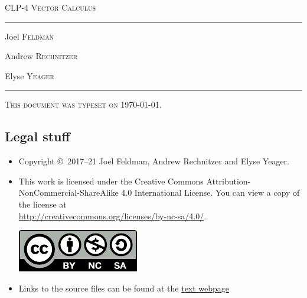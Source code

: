 \documentclass[12pt,letterpaper, openany]{book}
\begin{document}
\setcounter{page}{0}

\begin{titlepage} 
\begin{center} 
\textsc{\LARGE
CLP-4 Vector Calculus
}\\[2ex]

\vspace{5ex}
\hrule
\vspace{5ex}

\begin{minipage}[t]{0.3\textwidth} \begin{flushleft}
\large Joel \textsc{Feldman}
\end{flushleft} \end{minipage}%
\begin{minipage}[t]{0.3\textwidth} \begin{flushleft}
\large Andrew \textsc{Rechnitzer}
\end{flushleft} \end{minipage}%
\begin{minipage}[t]{0.3\textwidth} \begin{flushright}
\large Elyse \textsc{Yeager}
\end{flushright} \end{minipage}%
\end{center}
\vspace{2ex}
\hrule

\vfill
\textsc{This document was typeset on \today.}
\end{titlepage}

\subsection*{Legal stuff}
\begin{itemize}
 \item Copyright \copyright\ 2017--21 Joel Feldman, Andrew Rechnitzer and Elyse Yeager.

\item This work is licensed under the
Creative Commons Attribution-NonCommercial-ShareAlike 4.0 International
License. You can view a copy of the license at \\
\url{http://creativecommons.org/licenses/by-nc-sa/4.0/}.
\begin{center}
 \includegraphics{by-nc-sa.pdf}
\end{center}


\item Links to the source files can be found at the \href{http://www.math.ubc.ca/~CLP/index.html}{text webpage}
\end{itemize}
\end{document}
